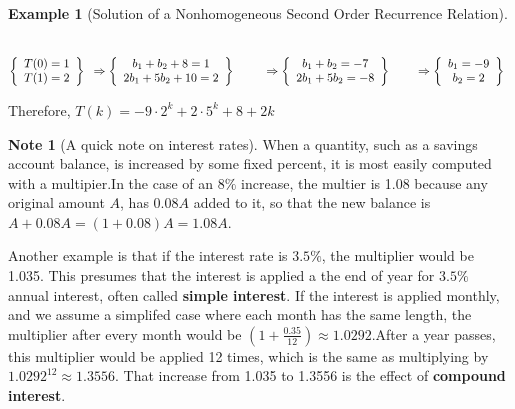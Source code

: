 \documentclass[10pt,]{book}
\newcommand{\terminology}[1]{\textbf{#1}}
\theoremstyle{plain}
\theoremstyle{definition}
\theoremstyle{definition}
\newtheorem{note}[theorem]{Note}
\theoremstyle{definition}
\newtheorem{example}[theorem]{Example}
\theoremstyle{definition}
\numberwithin{equation}{section}
\begin{document}
\begin{example}[Solution of a Nonhomogeneous Second Order Recurrence Relation]
\begin{enumerate}[label=\alph*]
 \(\quad\) \(\left\{
\begin{array}{c}
 T(0)=1 \\
 T(1)=2 \\
\end{array}
\right\}\textrm{  }\Rightarrow \left\{
\begin{array}{c}
 b_1+ b_2+8=1 \\
 2b_1+5b_2+10=2 \\
\end{array}
\right\}\textrm{  }\\
\\
\quad \quad \Rightarrow \left\{
\begin{array}{c}
 b_1+b_2=-7 \\
 2b_1+5b_2=-8 \\
\end{array}
\right\}\\
\\
\quad \quad \Rightarrow \left\{
\begin{array}{c}
 b_1=-9 \\
 b_2=2 \\
\end{array}
\right\}\textrm{  }\)
%
\par
Therefore,  \(T(k) =-9\cdot 2^k+ 2\cdot 5^k+8+2k\)
%
\end{enumerate}
%
\end{example}
\begin{note}[A quick note on interest rates]\label{note-1}
When a quantity, such as a savings account balance, is increased by some fixed percent, it is most easily
computed with a multipier.In the case of an \(8\%\) increase, the multier is 1.08 because any original amount \(A\), has \(0.08A\) added
to it, so that the new balance is \(A+0.08A = (1+0.08)A = 1.08 A\).%
\par
Another example is that if the interest rate is \(3.5\%\), the multiplier would be 1.035. This presumes that the interest is applied a the end
of year for \(3.5\%\) annual interest, often called \terminology{simple interest}. If the interest is applied monthly, and we assume a simplifed case
where each month has the same length, the multiplier after every month would be \(\left(1+\frac{0.35}{12}\right) \approx  1.0292\).After a
year passes, this multiplier would be applied 12 times, which is the same as multiplying by\(1.0292^{12}\approx 1.3556\). That increase from
1.035 to 1.3556 is the effect of \terminology{compound interest}.%
\end{note}
\end{document}
